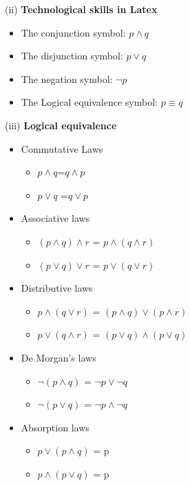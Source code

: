 \documentclass{article}
\begin{document}
(ii) \textbf{Technological skills in Latex}
\begin{itemize}
\item The conjunction symbol: $p \land q$
\item The disjunction symbol: $p \lor q$
\item The negation symbol: $\neg p$
\item The Logical equivalence symbol: $p \equiv q $
\end{itemize}


(iii) \textbf{Logical equivalence}

\begin{itemize}
\item{Commutative Laws}
\begin{itemize}
 \item $p \land q$=$q \land p$

 \item $p \lor q$ =$q \lor p$
\end{itemize}

\item{Associative laws}
\begin{itemize}
\item$ (p \land q) \land r $ = $p \land (q \land r)$
\item $(p \lor q) \lor r$ = $p \lor (q \lor r)$
\end{itemize}

\item{Distributive laws}
\begin{itemize}

\item $p \land (q \lor r)$ =  $(p \land q) \lor (p \land r)$

\item $p \lor (q \land r)$ = $(p \lor q) \land (p \lor q)$
\end{itemize}

\item{De Morgan’s laws}
\begin{itemize}

\item  $ \neg(p\land q)$ = $\neg p \lor \neg q$
\item  $\neg (p \lor q)$ = $\neg p \land \neg q$

\end{itemize}

\item{Absorption laws}
\begin{itemize}
\item $p \lor (p \land q)$ = p
\item $p \land (p \lor q)$ = p
\end{itemize}


\end{itemize}
\end{document}
